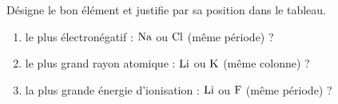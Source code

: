 \documentclass[11pt,a4paper]{article}
\begin{document}
\begin{exo}
Désigne le bon élément et justifie par sa position dans le tableau.
\begin{enumerate}[label=\alph*)]
  \item le plus électronégatif : $\ce{Na}$ ou $\ce{Cl}$ (même période) ?
  \item le plus grand rayon atomique : $\ce{Li}$ ou $\ce{K}$ (même colonne) ?
  \item la plus grande énergie d'ionisation : $\ce{Li}$ ou $\ce{F}$ (même période) ?
\end{enumerate}
\end{exo}
\end{document}
